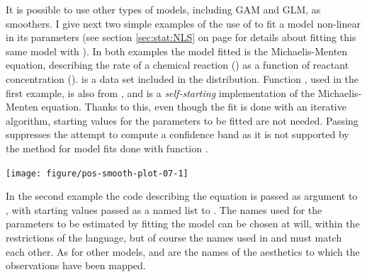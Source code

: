 \documentclass[krantz2]{krantz}\usepackage{knitr}
\begin{document}
It is possible to use other types of models, including GAM and GLM, as smoothers.  I give next two simple examples of the use of  to fit a model non-linear in its parameters (see section \ref{sec:stat:NLS} on page \pageref{sec:stat:NLS} for details about fitting this same model with ). In both examples the model fitted is the Michaelis-Menten equation, describing the rate of a chemical reaction () as a function of reactant concentration ().  is a data set included in the \Rlang distribution. Function , used in the first example, is also from \Rlang, and is a \emph{self-starting} implementation of the Michaelis-Menten equation. Thanks to this, even though the fit is done with an iterative algorithm, starting values for the parameters to be fitted are not needed. Passing  suppresses the attempt to compute a confidence band as it is not supported by the  method for model fits done with function .

\begin{knitrout}\footnotesize
{}\color{fgcolor}\begin{kframe}
\begin{alltt}
\hlstd{(} 
        \hlstd{=}    \hlopt{+}
  \hlstd{()} \hlopt{+}
  \hlstd{(} \hlstd{=} \hlstd{,}   \hlopt{~}   \hlstd{=} \hlstd{)}
\end{alltt}
\end{kframe}

{\centering \texttt{[image: figure/pos-smooth-plot-07-1]} 

}


\end{knitrout}

In the second example the code describing the equation is passed as argument to , with starting values passed as a named list to . The names used for the parameters to be estimated by fitting the model can be chosen at will, within the restrictions of the \Rlang language, but of course the names used in  and  must match each other. As for other models,  and  are the names of the aesthetics to which the observations have been mapped.
\end{document}
